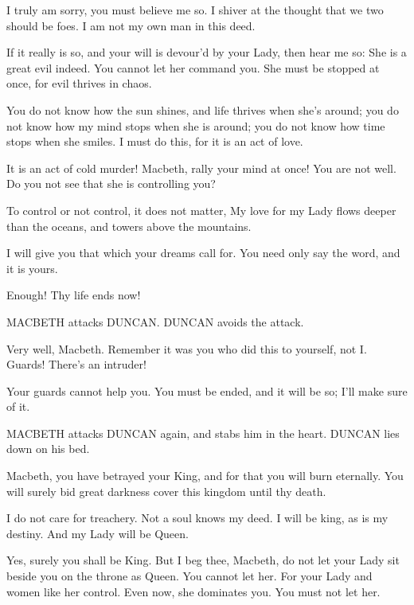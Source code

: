 \documentclass{article}
\begin{document}
\macbeth I truly am sorry, you must believe me so. I shiver at the thought that we two should be foes. I am not my own man in this deed.

\duncan If it really is so, and your will is devour'd by your Lady, then hear me so: She is a great evil indeed. You cannot let her command you. She must be stopped at once, for evil thrives in chaos.

\macbeth You do not know how the sun shines, and life thrives when she's around; you do not know how my mind stops when she is around; you do not know how time stops when she smiles. I must do this, for it is an act of love.

\duncan It is an act of cold murder! Macbeth, rally your mind at once! You are not well. Do you not see that she is controlling you?

\macbeth To control or not control, it does not matter, My love for my Lady flows deeper than the oceans, and towers above the mountains.

\duncan I will give you that which your dreams call for. You need only say the word, and it is yours.

\macbeth Enough! Thy life ends now!

\begin{dida}
MACBETH attacks DUNCAN. DUNCAN avoids the attack.
\end{dida}

\duncan Very well, Macbeth. Remember it was you who did this to yourself, not I. Guards! There's an intruder!


\macbeth Your guards cannot help you. You must be ended, and it will be so; I'll make sure of it.

\begin{dida}
MACBETH attacks DUNCAN again, and stabs him in the heart. DUNCAN lies down on his bed.
\end{dida}

\duncan Macbeth, you have betrayed your King, and for that you will burn eternally. You will surely bid great darkness cover this kingdom until thy death.

\macbeth I do not care for treachery. Not a soul knows my deed. I will be king, as is my destiny. And my Lady will be Queen.

\duncan Yes, surely you shall be King. But I beg thee, Macbeth, do not let your Lady sit beside you on the throne as Queen. You cannot let her. For your Lady and women like her control. Even now, she dominates you. You must not let her.
\end{document}
